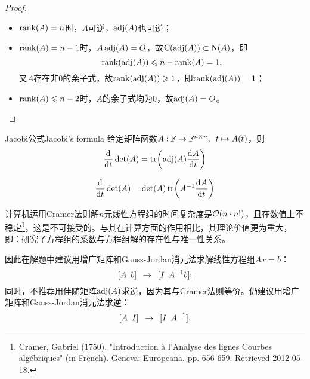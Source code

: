 \begin{proof}
	~
	\begin{itemize}
		\item $\operatorname{rank}(A)=n$时，$A$可逆，$\operatorname{adj}(A)$也可逆；
		
		\item $\operatorname{rank}(A)=n-1$时，$A\operatorname{adj}(A)=O$，故$\operatorname{C}(\operatorname{adj}(A))\subset\operatorname{N}(A)$，即
		\[
			\operatorname{rank}(\operatorname{adj}(A))\leqslant n-\operatorname{rank}(A)=1,
		\]
		又$A$存在非0的余子式，故$\operatorname{rank}(\operatorname{adj}(A))\geqslant 1$，即$\operatorname{rank}(\operatorname{adj}(A))=1$；
	
		\item $\operatorname{rank}(A)\leqslant n-2$时，$A$的余子式均为0，故$\operatorname{adj}(A)=O$。
		\qedhere
	\end{itemize}
\end{proof}

\begin{theorem}
	{Jacobi公式}{Jacobi's formula}
	给定矩阵函数$A:\mathbb F\to\mathbb F^{n\times n},\enspace t\mapsto A(t)$，则 
	\begin{equation}
		\label{eqn:Jacobi det'}
		\frac{\mathrm{d}^{{}}}{\mathrm{d}{t}^{{}}}\det(A)=\operatorname{tr}\biggl(\operatorname{adj}(A)\frac{\mathrm{d}^{{}}A}{\mathrm{d}{t}^{{}}}\biggr)
	\end{equation}
\end{theorem}

\begin{corollary}
	\begin{equation}
		\frac{\mathrm{d}^{{}}}{\mathrm{d}{t}^{{}}}\det(A)=\det(A)\operatorname{tr}\biggl(A^{-1}\frac{\mathrm{d}^{{}}A}{\mathrm{d}{t}^{{}}}\biggr)
	\end{equation}
\end{corollary}

\begin{remark}
	计算机运用Cramer法则解$n$元线性方程组的时间复杂度是$\mathcal O(n\cdot n!)$，且在数值上不稳定\footnote{Cramer, Gabriel (1750). "Introduction à l'Analyse des lignes Courbes algébriques" (in French). Geneva: Europeana. pp. 656-659. Retrieved 2012-05-18.}，这是不可接受的。与其在计算方面的作用相比，其理论价值更为重大，即：研究了方程组的系数与方程组解的存在性与唯一性关系。

	因此在解题中建议用增广矩阵和Gauss-Jordan消元法求解线性方程组$Ax=b$：
	\[
		[A\enspace b]\enspace\to\enspace[I\enspace A^{-1} b];
	\]
	同时，不推荐用伴随矩阵$\operatorname{adj}(A)$求逆，因为其与Cramer法则等价。仍建议用增广矩阵和Gauss-Jordan消元法求逆：
	\[
		[A\enspace I]\enspace\to\enspace[I\enspace A^{-1}].
	\]
\end{remark}

